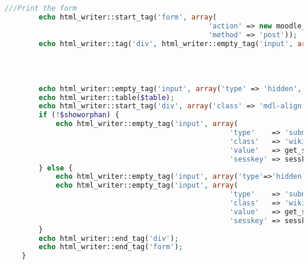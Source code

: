 \begin{lstlisting}[language=PHP]
        ///Print the form
        echo html_writer::start_tag('form', array(
                                                'action' => new moodle_url('/mod/wikicode/admin.php'),
                                                'method' => 'post'));
        echo html_writer::tag('div', html_writer::empty_tag('input', array(
                                                                         'type'  => 'hidden',
                                                                         'name'  => 'pageid',
                                                                         'value' => $this->page->id)));

        echo html_writer::empty_tag('input', array('type' => 'hidden', 'name' => 'option', 'value' => $this->view));
        echo html_writer::table($table);
        echo html_writer::start_tag('div', array('class' => 'mdl-align'));
        if (!$showorphan) {
            echo html_writer::empty_tag('input', array(
                                                     'type'    => 'submit',
                                                     'class'   => 'wikicode_form-button',
                                                     'value'   => get_string('listorphan', 'wikicode'),
                                                     'sesskey' => sesskey()));
        } else {
            echo html_writer::empty_tag('input', array('type'=>'hidden', 'name'=>'listall', 'value'=>'1'));
            echo html_writer::empty_tag('input', array(
                                                     'type'    => 'submit',
                                                     'class'   => 'wikicode_form-button',
                                                     'value'   => get_string('listall', 'wikicode'),
                                                     'sesskey' => sesskey()));
        }
        echo html_writer::end_tag('div');
        echo html_writer::end_tag('form');
    }


\end{lstlisting}
